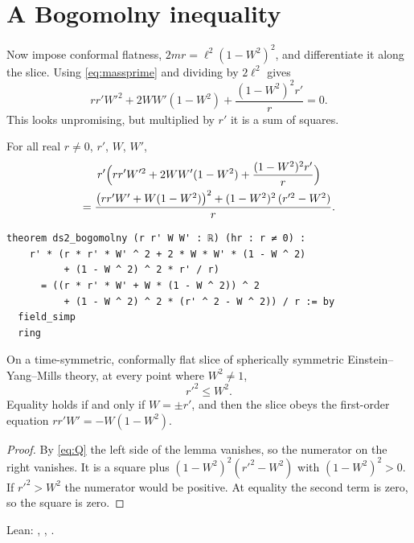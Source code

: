 \section{A Bogomolny inequality}

Now impose conformal flatness, $2mr=\ell^2(1-W^2)^2$, and differentiate it along the slice. Using \eqref{eq:massprime} and dividing by $2\ell^2$ gives
\begin{equation}\label{eq:Q}
r r' W'^2 + 2WW'(1-W^2) + \frac{(1-W^2)^2 r'}{r}=0 .
\end{equation}
This looks unpromising, but multiplied by $r'$ it is a sum of squares.

\begin{lemma}\proved
For all real $r\ne0$, $r'$, $W$, $W'$,
\begin{multline*}
r'\Bigl(rr'W'^2+2WW'(1-W^2)+\frac{(1-W^2)^2r'}{r}\Bigr)\\
=\frac{\bigl(rr'W'+W(1-W^2)\bigr)^2+(1-W^2)^2\,(r'^2-W^2)}{r}.
\end{multline*}
\end{lemma}

\begin{leanbox}
\begin{Verbatim}[fontsize=\small]
theorem ds2_bogomolny (r r' W W' : ℝ) (hr : r ≠ 0) :
    r' * (r * r' * W' ^ 2 + 2 * W * W' * (1 - W ^ 2)
          + (1 - W ^ 2) ^ 2 * r' / r)
      = ((r * r' * W' + W * (1 - W ^ 2)) ^ 2
          + (1 - W ^ 2) ^ 2 * (r' ^ 2 - W ^ 2)) / r := by
  field_simp
  ring
\end{Verbatim}
\end{leanbox}

\begin{theorem}\proved\label{thm:bog}
On a time-symmetric, conformally flat slice of spherically symmetric Einstein--Yang--Mills theory, at every point where $W^2\ne1$,
\[
r'^2\le W^2 .
\]
Equality holds if and only if $W=\pm r'$, and then the slice obeys the first-order equation $rr'W'=-W(1-W^2)$.
\end{theorem}

\begin{proof}
By \eqref{eq:Q} the left side of the lemma vanishes, so the numerator on the right vanishes. It is a square plus $(1-W^2)^2(r'^2-W^2)$ with $(1-W^2)^2>0$. If $r'^2>W^2$ the numerator would be positive. At equality the second term is zero, so the square is zero.
\end{proof}
\noindent Lean: , , .

